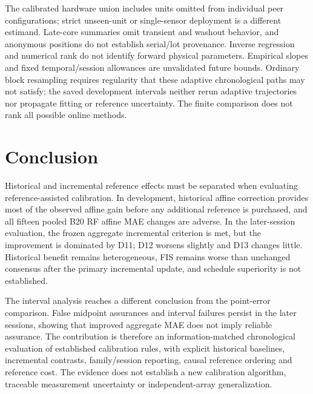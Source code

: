 The calibrated hardware union includes units omitted from individual peer configurations; strict unseen-unit or single-sensor deployment is a different estimand. Late-core summaries omit transient and washout behavior, and anonymous positions do not establish serial/lot provenance. Inverse regression and numerical rank do not identify forward physical parameters. Empirical slopes and fixed temporal/session allowances are unvalidated future bounds. Ordinary block resampling requires regularity that these adaptive chronological paths may not satisfy; the saved development intervals neither rerun adaptive trajectories nor propagate fitting or reference uncertainty. The finite comparison does not rank all possible online methods.

\section{Conclusion}
Historical and incremental reference effects must be separated when evaluating reference-assisted calibration. In development, historical affine correction provides most of the observed affine gain before any additional reference is purchased, and all fifteen pooled B20 RF affine MAE changes are adverse. In the later-session evaluation, the frozen aggregate incremental criterion is met, but the improvement is dominated by D11; D12 worsens slightly and D13 changes little. Historical benefit remains heterogeneous, FIS remains worse than unchanged consensus after the primary incremental update, and schedule superiority is not established.

The interval analysis reaches a different conclusion from the point-error comparison. False midpoint assurances and interval failures persist in the later sessions, showing that improved aggregate MAE does not imply reliable assurance. The contribution is therefore an information-matched chronological evaluation of established calibration rules, with explicit historical baselines, incremental contrasts, family/session reporting, causal reference ordering and reference cost. The evidence does not establish a new calibration algorithm, traceable measurement uncertainty or independent-array generalization.
